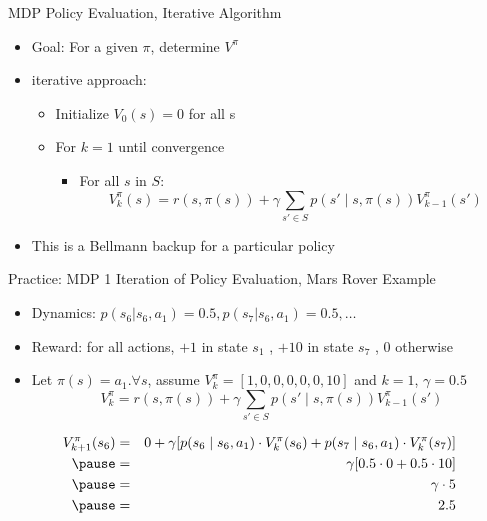 \documentclass[aspectratio=169]{../latex_main/tntbeamer}  %
\begin{document}
\begin{frame}[c]{MDP Policy Evaluation, Iterative Algorithm}

\begin{itemize}
	\item Goal: For a given $\pi$, determine $V^\pi$
	\item iterative approach:
	\begin{itemize}
		\item Initialize $V_0(s) = 0 $ for all s
		\item For $k=1$ until convergence
		\begin{itemize}
			\item For all $s$ in $S$:
			$$V^\pi_k (s)  = r(s, \pi(s)) + \gamma \sum_{s'\in S} p(s'\mid s, \pi(s)) V_{k-1}^\pi (s')$$
		\end{itemize}
	\end{itemize}
	\item This is a Bellmann backup for a particular policy
\end{itemize}

\end{frame}
\begin{frame}[c]{Practice: MDP 1 Iteration of Policy Evaluation, Mars Rover Example}

\begin{itemize}
	\item Dynamics: $p(s_6 |s_6 , a_1 ) = 0.5, p(s_7 |s_6 , a_1 ) = 0.5, \ldots$
	\item Reward: for all actions, $+1$ in state $s_1$ , $+10$ in state $s_7$ , $0$ otherwise
	\item Let $\pi(s) = a_1.\forall s$, assume $V^\pi_k =[1,0,0,0,0,0,10]$ and $k = 1$, $\gamma = 0.5$
			$$V^\pi_k  = r(s, \pi(s)) + \gamma \sum_{s'\in S} p(s'\mid s, \pi(s)) V_{k-1}^\pi (s')$$
\end{itemize}

\pause

\begin{eqnarray}
V^\pi_{k+1} (s_6) &=& 0  + \gamma [ p(s_6 \mid s_6, a_1) \cdot V^\pi_k(s_6) + p(s_7 \mid s_6 , a_1) \cdot V^\pi_k(s_7) ] \nonumber\\
\pause
&=& \gamma [0.5 \cdot 0 + 0.5 \cdot 10] \nonumber\\
\pause
&=& \gamma \cdot 5 \nonumber\\
\pause
&=& 2.5 \nonumber\\
\end{eqnarray}

\end{frame}
\end{document}
